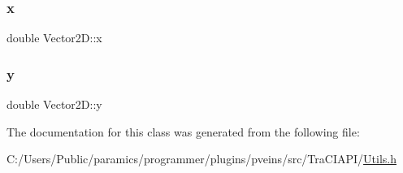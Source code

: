 \subsubsection{\texorpdfstring{x}{x}}
{\footnotesize\ttfamily double Vector2\+D\+::x}

\mbox{\label{class_vector2_d_ac38d0179cfe74c30fee290a703ab209a}} 
\subsubsection{\texorpdfstring{y}{y}}
{\footnotesize\ttfamily double Vector2\+D\+::y}



The documentation for this class was generated from the following file\+:\begin{DoxyCompactItemize}
\item 
C\+:/\+Users/\+Public/paramics/programmer/plugins/pveins/src/\+Tra\+C\+I\+A\+P\+I/\hyperlink{_utils_8h}{Utils.\+h}\end{DoxyCompactItemize}
